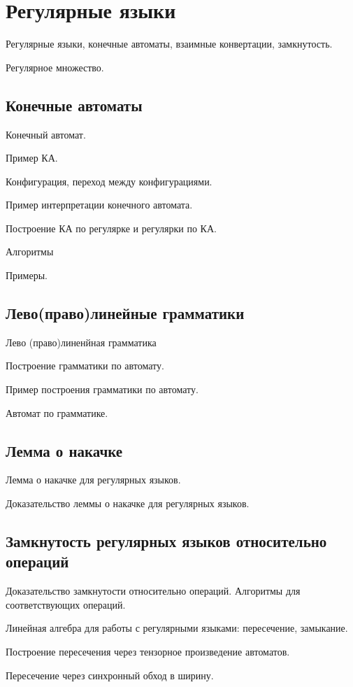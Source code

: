 \chapter{Регулярные языки}

Регулярные языки, конечные автоматы, взаимные конвертации, замкнутость.

\begin{definition}
    Регулярное множество.
\end{definition}

\section{Конечные автоматы}

\begin{definition}
    Конечный автомат.
\end{definition}

Пример КА.

Конфигурация, переход между конфигурациями.

Пример интерпретации конечного автомата.

Построение КА по регулярке и регулярки по КА. 

Алгоритмы 

Примеры.

\section{Лево(право)линейные грамматики}

\begin{definition}
    Лево (право)линенйная грамматика
\end{definition}

Построение грамматики по автомату.

Пример построения грамматики по автомату.

Автомат по грамматике. 

\section{Лемма о накачке}

Лемма о накачке для регулярных языков.

Доказательство леммы о накачке для регулярных языков.

\section{Замкнутость регулярных языков относительно операций}

Доказательство замкнутости относительно операций. Алгоритмы для соответствующих операций.

Линейная алгебра для работы с регулярными языками: пересечение, замыкание.

Построение пересечения через тензорное произведение автоматов.

Пересечение через синхронный обход в ширину.

%
%
